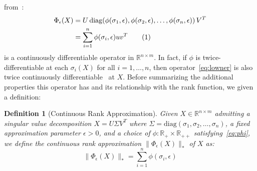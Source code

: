\documentclass[12pt]{article}
\numberwithin{equation}{section}
\newcommand{\+}{%
	\raisebox{0.18ex}{\scaleobj{0.55}{+}}
}
\newtheorem{definition}{Definition}
\theoremstyle{definition}
\newcommand\numberthis{\addtocounter{equation}{1}\tag{\theequation}}
\begin{document}
from~\cite{ding2018spectral}: 
\begin{align*}\label{eq:lowner}
 \Phi_\epsilon (X) & = U \, \mathrm{diag}( \phi(\sigma_1, \epsilon), \phi(\sigma_2, \epsilon), \dots, \phi(\sigma_n, \epsilon)) \, V^T \\
 & = \sum\limits_{i=1}^{n} \phi(\sigma_i, \epsilon) u v^T\numberthis
\end{align*}
is a continuously differentiable operator in $\mathbb{R}^{n \times m}$. 
In fact, if $\phi$ is twice-differentiable at each $\sigma_i(X)$ for all $i = 1, \dots, n$, then operator~\eqref{eq:lowner} is also twice continuously differentiable~\cite{ding2018spectral} at $X$. 
Before summarizing the additional properties this operator has and its relationship with the rank function, we given a definition:
\begin{definition}[Continuous Rank Approximation]
	Given $X \in \mathbb{R}^{n \times m}$ admitting a singular value decomposition $X = U \Sigma V^T$ where $\Sigma = \mathrm{diag}(\sigma_1, \sigma_2, \dots, \sigma_n)$, a fixed approximation parameter $\epsilon > 0$, and a choice of $\phi: \mathbb{R}_+ \times \mathbb{R}_{++}$ satisfying~\eqref{eq:phi}, we define the \emph{continuous rank approximation} $\lVert \Phi_\epsilon(X) \rVert_\ast$ of $X$ as: 
	\begin{equation}\label{def:cont_rank}
		\lVert \Phi_\epsilon(X) \rVert_\ast = \sum\limits_{i=1}^n \phi(\sigma_i, \epsilon)
	\end{equation}
\end{definition}
\end{document}
